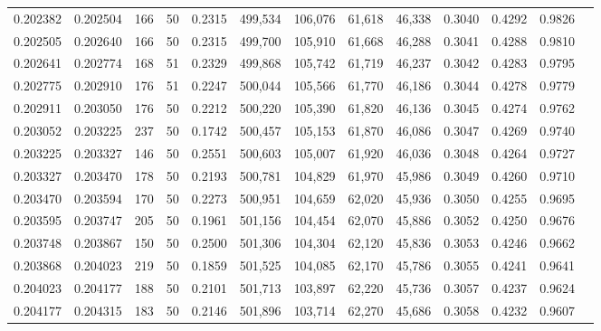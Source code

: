 \begin{tabular}{rrrrrrrrrrrrr}
0.202382 & 0.202504 &   166 &  50 &                                     0.2315 & 499,534 & 106,076 &  61,618 &  46,338 & 0.3040 & 0.4292 & 0.9826 \\
0.202505 & 0.202640 &   166 &  50 &                                     0.2315 & 499,700 & 105,910 &  61,668 &  46,288 & 0.3041 & 0.4288 & 0.9810 \\
0.202641 & 0.202774 &   168 &  51 &                                     0.2329 & 499,868 & 105,742 &  61,719 &  46,237 & 0.3042 & 0.4283 & 0.9795 \\
0.202775 & 0.202910 &   176 &  51 &                                     0.2247 & 500,044 & 105,566 &  61,770 &  46,186 & 0.3044 & 0.4278 & 0.9779 \\
0.202911 & 0.203050 &   176 &  50 &                                     0.2212 & 500,220 & 105,390 &  61,820 &  46,136 & 0.3045 & 0.4274 & 0.9762 \\
0.203052 & 0.203225 &   237 &  50 &                                     0.1742 & 500,457 & 105,153 &  61,870 &  46,086 & 0.3047 & 0.4269 & 0.9740 \\
0.203225 & 0.203327 &   146 &  50 &                                     0.2551 & 500,603 & 105,007 &  61,920 &  46,036 & 0.3048 & 0.4264 & 0.9727 \\
0.203327 & 0.203470 &   178 &  50 &                                     0.2193 & 500,781 & 104,829 &  61,970 &  45,986 & 0.3049 & 0.4260 & 0.9710 \\
0.203470 & 0.203594 &   170 &  50 &                                     0.2273 & 500,951 & 104,659 &  62,020 &  45,936 & 0.3050 & 0.4255 & 0.9695 \\
0.203595 & 0.203747 &   205 &  50 &                                     0.1961 & 501,156 & 104,454 &  62,070 &  45,886 & 0.3052 & 0.4250 & 0.9676 \\
0.203748 & 0.203867 &   150 &  50 &                                     0.2500 & 501,306 & 104,304 &  62,120 &  45,836 & 0.3053 & 0.4246 & 0.9662 \\
0.203868 & 0.204023 &   219 &  50 &                                     0.1859 & 501,525 & 104,085 &  62,170 &  45,786 & 0.3055 & 0.4241 & 0.9641 \\
0.204023 & 0.204177 &   188 &  50 &                                     0.2101 & 501,713 & 103,897 &  62,220 &  45,736 & 0.3057 & 0.4237 & 0.9624 \\
0.204177 & 0.204315 &   183 &  50 &                                     0.2146 & 501,896 & 103,714 &  62,270 &  45,686 & 0.3058 & 0.4232 & 0.9607 \\

\end{tabular}
